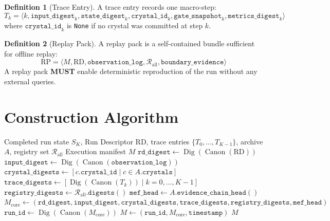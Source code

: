 \documentclass[11pt,a4paper,twoside]{article}
\theoremstyle{definition}
\newtheorem{definition}{Definition}[section]
\theoremstyle{plain}
\theoremstyle{remark}
\newcommand{\calR}{\mathcal{R}}
\DeclareMathOperator{\Canon}{Canon}
\DeclareMathOperator{\Dig}{Dig}
\begin{document}
\begin{definition}[Trace Entry]\label{def:trace}
A trace entry records one macro-step:
\[
  T_k = \langle k, \mathtt{input\_digest}_k,
        \mathtt{state\_digest}_k, \mathtt{crystal\_id}_k,
        \mathtt{gate\_snapshot}_k, \mathtt{metrics\_digest}_k \rangle
\]
where $\mathtt{crystal\_id}_k$ is \texttt{None} if no crystal was
committed at step $k$.
\end{definition}

\begin{definition}[Replay Pack]\label{def:replaypack}
A replay pack is a self-contained bundle sufficient for offline replay:
\[
  \mathrm{RP} = \langle M, \mathrm{RD}, \mathtt{observation\_log},
  \calR_{\mathrm{all}}, \mathtt{boundary\_evidence} \rangle
\]
A replay pack \textbf{MUST} enable deterministic reproduction of the run
without any external queries.
\end{definition}

\section{Construction Algorithm}\label{sec:man:algo}

\begin{algorithm}[H]
\caption{\textsc{BuildManifest}: Construct execution manifest post-run}
\label{alg:buildmanifest}
\begin{algorithmic}[1]
\REQUIRE Completed run state $S_K$, Run Descriptor $\mathrm{RD}$,
  trace entries $\{T_0, \ldots, T_{K-1}\}$, archive $A$,
  registry set $\calR_{\mathrm{all}}$
\ENSURE Execution manifest $M$
\STATE $\mathtt{rd\_digest} \gets \Dig(\Canon(\mathrm{RD}))$
\STATE $\mathtt{input\_digest} \gets \Dig(\Canon(\mathtt{observation\_log}))$
\STATE $\mathtt{crystal\_digests} \gets [c.\mathtt{crystal\_id} \mid c \in A.\mathtt{crystals}]$
\STATE $\mathtt{trace\_digests} \gets [\Dig(\Canon(T_k)) \mid k = 0, \ldots, K-1]$
\STATE $\mathtt{registry\_digests} \gets \calR_{\mathrm{all}}.\mathtt{digests}()$
\STATE $\mathtt{mef\_head} \gets A.\mathtt{evidence\_chain\_head}()$
\STATE $M_{\mathrm{core}} \gets (\mathtt{rd\_digest}, \mathtt{input\_digest},
  \mathtt{crystal\_digests}, \mathtt{trace\_digests},
  \mathtt{registry\_digests}, \mathtt{mef\_head})$
\STATE $\mathtt{run\_id} \gets \Dig(\Canon(M_{\mathrm{core}}))$
\STATE $M \gets (\mathtt{run\_id}, M_{\mathrm{core}}, \mathtt{timestamp})$
\RETURN $M$
\end{algorithmic}
\end{algorithm}
\end{document}
